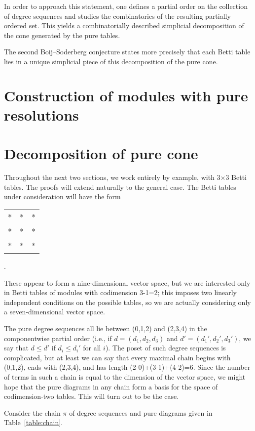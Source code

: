 \documentclass[12pt]{amsart}
\theoremstyle{plain}
\theoremstyle{definition}
\theoremstyle{remark}
\begin{document}
In order to approach this statement, one defines a partial order on the collection of degree sequences
and studies the combinatorics of the resulting partially ordered set.
This yields a combinatorially described simplicial decomposition of the cone generated by the pure tables.

The second Boij--Soderberg conjecture states more precisely that each Betti table lies in a unique simplicial
piece of this decomposition of the pure cone.


\section{Construction of modules with pure resolutions}

\section{Decomposition of pure cone}

Throughout the next two sections, we work entirely by example, with
3$\times$3 Betti tables.  The proofs will extend naturally to the
general case.  The Betti tables under consideration will have the form

\begin{tabular}{ccc}
*&*&*\\
*&*&*\\
*&*&*
\end{tabular}.

These appear to form a nine-dimensional vector space, but we are
interested only in Betti tables of modules with codimension 3-1=2;
this imposes two linearly independent conditions on the possible
tables, so we are actually considering only a seven-dimensional vector
space.

The pure degree sequences all lie between (0,1,2) and (2,3,4) in the
componentwise partial order (i.e., if $d=(d_1,d_2,d_3)$ and
$d'=(d_1',d_2',d_3')$, we say that $d\leq d'$ if $d_i\leq d_i'$ for
all $i$).  The poset of such degree sequences is complicated, but at
least we can say that every maximal chain begins with (0,1,2), ends
with (2,3,4), and has length (2-0)+(3-1)+(4-2)=6.  Since the number of
terms in such a chain is equal to the dimension of the vector space,
we might hope that the pure diagrams in any chain form a basis for the
space of codimension-two tables.  This will turn out to be the case.  

Consider the chain $\pi$ of degree sequences and pure diagrams given
in Table~\ref{table:chain}.
\end{document}
